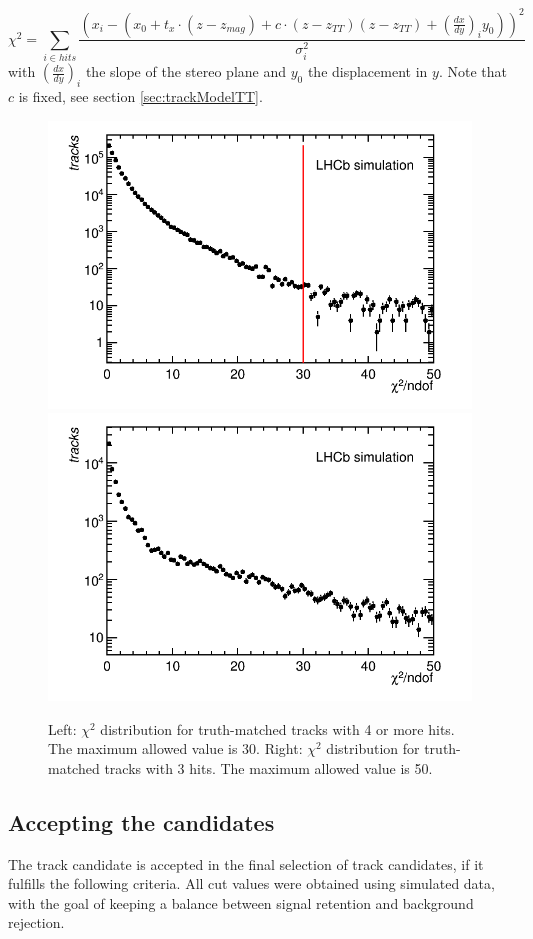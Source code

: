 \begin{equation}
\chi^{2} = \sum_{i \in hits} \frac{ \left(x_{i} - (x_{0} + t_{x}\cdot(z-z_{mag}) + c \cdot (z - z_{TT})(z - z_{TT}) + \left( \frac{dx}{dy} \right)_{i} y_{0}) \right)^{2}  }{\sigma_{i}^{2}}
\end{equation}
with $\left( \frac{dx}{dy} \right)_{i}$ the slope of the stereo plane and
$y_{0}$ the displacement in $y$. Note that $c$ is fixed, see section \ref{sec:trackModelTT}.

\begin{figure}[!htbp]
 \begin{center}
  \includegraphics[width=0.49\linewidth]{figures/chi2Cut1.png}
  \includegraphics[width=0.49\linewidth]{figures/chi2Cut3Hits1.png}
   \caption{Left: $\chi^{2}$ distribution for truth-matched tracks with 4 or more
   hits. The maximum allowed value is 30. Right: $\chi^{2}$ distribution for
   truth-matched tracks with 3 hits. The maximum allowed value is 50.
   \label{fig:chi2Cuts}}
 \end{center}
\end{figure}

\subsection{Accepting the candidates}
\label{sec:acceptCandidate}
The track candidate is accepted in the final selection of track candidates,
if it fulfills the following criteria. All cut values were obtained using simulated data, 
with the goal of keeping a balance between signal retention and background rejection. 

